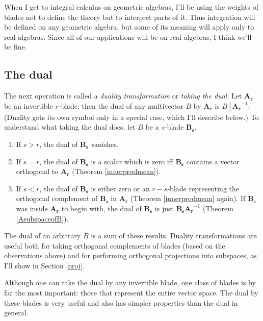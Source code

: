 \documentclass{utarticle}
\newcommand{\bl}[1]{\ensuremath{\bm{#1}}}
\DeclareMathOperator{\lin}{\rfloor}
\begin{document}
When I get to integral calculus on geometric algebras, I'll be using the weights of 
blades not to define the theory but to interpret parts of it.  Thus integration will be
defined on any geometric algebra, but some of its meaning will apply only to real 
algebras.  Since all of our applications will be on real algebras, I think we'll be fine.

\subsection{The dual}
\label{dual}

The next operation is called a \emph{duality transformation} or \emph{taking the dual}.  
Let \bl{A_r} be an invertible $r$-blade; then the dual of any multivector $B$ by
\bl{A_r} is $B \lin \bl{A_r}^{-1}$.  (Duality gets its own symbol only in a special case, 
which I'll describe below.)  To understand what taking the dual does, let $B$ be a 
$s$-blade \bl{B_s}.
\begin{enumerate}
\item If $s > r$, the dual of \bl{B_s} vanishes.
\item If $s=r$, the dual of \bl{B_s} is a scalar which is zero iff \bl{B_s} contains 
          a vector orthogonal to \bl{A_r} (Theorem \ref{innerprodmean}).
\item If $s < r$, the dual of \bl{B_s} is either zero or an $r-s$-blade representing 
          the orthogonal complement of \bl{B_s} in \bl{A_r} (Theorem \ref{innerprodmean} 
          again).  If \bl{B_s} was inside \bl{A_r} to begin with, the dual of \bl{B_s} is just 
          $\bl{B_s}\bl{A_r}^{-1}$ (Theorem \ref{AsubspaceofB}).  
\end{enumerate}
The dual of an arbitrary $B$ is a sum of these results.  Duality 
transformations are useful both for taking orthogonal complements of 
blades (based on the observations above) and for performing orthogonal 
projections into subspaces, as I'll show in Section \ref{proj}.

Although one can take the dual by any invertible blade, one class of blades is by far
the most important: those that represent the entire vector space.  The dual by 
these blades is very useful and also has simpler properties than the dual in general.
\end{document}
